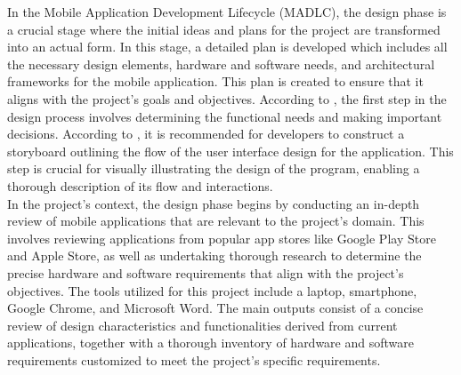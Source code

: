 In the Mobile Application Development Lifecycle (MADLC), the design phase is a crucial stage where the initial ideas and plans for the project are transformed into an actual form. In this stage, a detailed plan is developed which includes all the necessary design elements, hardware and software needs, and architectural frameworks for the mobile application. This plan is created to ensure that it aligns with the project's goals and objectives. According to \textcite{wambua23}, the first step in the design process involves determining the functional needs and making important decisions. According to \textcite{shanmugam19}, it is recommended for developers to construct a storyboard outlining the flow of the user interface design for the application. This step is crucial for visually illustrating the design of the program, enabling a thorough description of its flow and interactions. \\

In the project's context, the design phase begins by conducting an in-depth review of mobile applications that are relevant to the project's domain. This involves reviewing applications from popular app stores like Google Play Store and Apple Store, as well as undertaking thorough research to determine the precise hardware and software requirements that align with the project's objectives. The tools utilized for this project include a laptop, smartphone, Google Chrome, and Microsoft Word. The main outputs consist of a concise review of design characteristics and functionalities derived from current applications, together with a thorough inventory of hardware and software requirements customized to meet the project's specific requirements. \\

